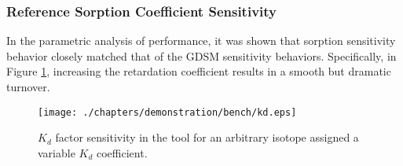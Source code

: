
\subsubsection{Reference Sorption Coefficient Sensitivity}

In the parametric analysis of \Cyder performance, it was shown that sorption 
sensitivity behavior closely matched that of the \gls{GDSM} sensitivity 
behaviors. Specifically, in Figure \ref{fig:kd_result}, increasing the retardation 
coefficient results in a smooth but dramatic turnover. 

\begin{figure}[ht]
\centering
\texttt{[image: ./chapters/demonstration/bench/kd.eps]}
\caption{$K_d$ factor sensitivity in the \Cyder tool for an arbitrary isotope 
assigned a variable $K_d$ coefficient.} 
\label{fig:kd_result}
\end{figure}
